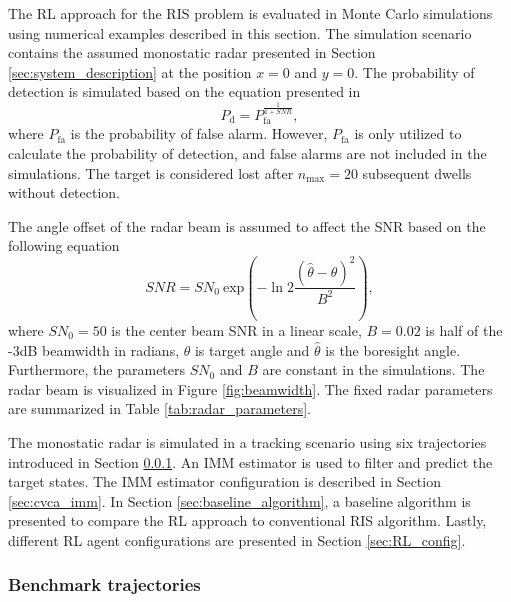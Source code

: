 \documentclass[english, 12pt, a4paper, elec, utf8, a-1b, online]{aaltothesis}
\numberwithin{equation}{section}
\newcommand{\sno}{SN_0}
\renewcommand{\exp}[1]{\text{exp}\left( #1 \right)}
\newcommand{\nmax}{n_\text{max}}
\begin{document}
The RL approach for the RIS problem is evaluated in Monte Carlo simulations using numerical examples described in this section.
The simulation scenario contains the assumed monostatic radar presented in Section \ref{sec:system_description} at the position $x=0$ and $y=0$. 
The probability of detection is simulated based on the equation presented in \cite{vanKeuk1993}
\begin{equation}\label{eq:singer_1_pd}
    P_\text{d} = P_\text{fa}^{\frac{1}{1+SNR}},
\end{equation}
where $P_\text{fa}$ is the probability of false alarm.
However, $P_\text{fa}$ is only utilized to calculate the probability of detection, and false alarms are not included in the simulations.
The target is considered lost after $\nmax=20$ subsequent dwells without detection.

The angle offset of the radar beam is assumed to affect the SNR based on the following equation
\begin{equation} \label{eq:offset_snr}
    SNR = \sno~\exp{ - \ln{2}
        \frac
            {(\hat{\theta} - \theta)^2}
            {B^2}},
\end{equation}
where $\sno=50$ is the center beam SNR in a linear scale, $B=0.02$ is half of the -3dB beamwidth in radians, $\theta$ is target angle and $\hat{\theta} $ is the boresight angle. 
Furthermore, the parameters $\sno$ and $B$ are constant in the simulations. 
The radar beam is visualized in Figure \ref{fig:beamwidth}.
The fixed radar parameters are summarized in Table \ref{tab:radar_parameters}.

The monostatic radar is simulated in a tracking scenario using six trajectories introduced in Section \ref{sec:benchmark_trajectories}.
An IMM estimator is used to filter and predict the target states. 
The IMM estimator configuration is described in Section \ref{sec:cvca_imm}.
In Section \ref{sec:baseline_algorithm}, a baseline algorithm is presented to compare the RL approach to conventional RIS algorithm.
Lastly, different RL agent configurations are presented in Section \ref{sec:RL_config}.


\subsubsection{Benchmark trajectories} \label{sec:benchmark_trajectories}
\end{document}
